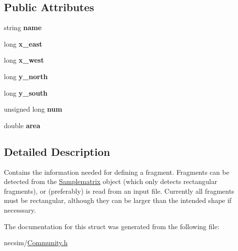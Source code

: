 \subsection*{Public Attributes}
\begin{DoxyCompactItemize}
\item 
string {\bfseries name}\hypertarget{struct_fragment_acf92da0ecedecb7080adf56e35543636}{}\label{struct_fragment_acf92da0ecedecb7080adf56e35543636}

\item 
long {\bfseries x\+\_\+east}\hypertarget{struct_fragment_a0257d6b1942656e4181eab82cc5392c4}{}\label{struct_fragment_a0257d6b1942656e4181eab82cc5392c4}

\item 
long {\bfseries x\+\_\+west}\hypertarget{struct_fragment_aabfd09652d5abae4b6393fd40e6d3d9d}{}\label{struct_fragment_aabfd09652d5abae4b6393fd40e6d3d9d}

\item 
long {\bfseries y\+\_\+north}\hypertarget{struct_fragment_a1d792c8e975cbc9405ece3a90a283c4f}{}\label{struct_fragment_a1d792c8e975cbc9405ece3a90a283c4f}

\item 
long {\bfseries y\+\_\+south}\hypertarget{struct_fragment_a71d7c613d71459b72158ef80ba705bfc}{}\label{struct_fragment_a71d7c613d71459b72158ef80ba705bfc}

\item 
unsigned long {\bfseries num}\hypertarget{struct_fragment_ac966a3ac928cba2706ca9c87f159d1ee}{}\label{struct_fragment_ac966a3ac928cba2706ca9c87f159d1ee}

\item 
double {\bfseries area}\hypertarget{struct_fragment_ad37e6d449d9b0b1273e712e5a4da2887}{}\label{struct_fragment_ad37e6d449d9b0b1273e712e5a4da2887}

\end{DoxyCompactItemize}


\subsection{Detailed Description}
Contains the information needed for defining a fragment. Fragments can be detected from the \hyperlink{class_samplematrix}{Samplematrix} object (which only detects rectangular fragments), or (preferably) is read from an input file. Currently all fragments must be rectangular, although they can be larger than the intended shape if necesssary. 

The documentation for this struct was generated from the following file\+:\begin{DoxyCompactItemize}
\item 
necsim/\hyperlink{_community_8h}{Community.\+h}\end{DoxyCompactItemize}
